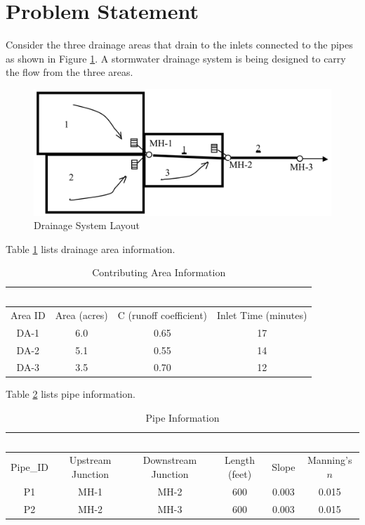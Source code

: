 \documentclass[12pt]{article}
\begin{document}
\section*{Problem Statement}
\label{prob:drainDesign} Consider the three drainage areas that drain to the inlets connected to the pipes as shown in Figure \ref{fig:DrainageLayout}.  
A stormwater drainage system is being designed to carry the flow from the three areas.  
\begin{figure}[ht!] %
\centering
   \includegraphics[width=6in]{DrainageLayout.jpg}
   \caption{Drainage System Layout}
   \label{fig:DrainageLayout} 
\end{figure}
Table \ref{tab:drainageArea} lists drainage area information.\\
\begin{table}[h!]
   \centering
   \caption{Contributing Area Information}
   \begin{tabular}{c c c c} %
   ~ & ~ & ~ & \\
   \hline
   \hline
      Area ID & Area (acres) & C (runoff coefficient) & Inlet Time (minutes) \\
      \hline
      DA-1 & 6.0 & 0.65 & 17 \\
      DA-2 & 5.1 & 0.55 & 14 \\
      DA-3 & 3.5 & 0.70 & 12 \\
      \hline
      \hline
   \end{tabular}
   \label{tab:drainageArea}
\end{table}

Table \ref{tab:pipes} lists pipe information.\\

\begin{table}[h!]
   \centering
   \caption{Pipe Information}
   \begin{tabular}{c c c c c c} %
   ~ & ~ & ~ & ~ & ~ & \\
   \hline
   \hline
      Pipe\_ID & Upstream Junction & Downstream Junction & Length (feet) & Slope & Manning's $n$ \\
      \hline
     P1 &  MH-1 & MH-2 & 600 & 0.003 & 0.015 \\
     P2 &  MH-2 & MH-3 & 600 & 0.003 & 0.015 \\
      \hline
      \hline
   \end{tabular}
   \label{tab:pipes}
\end{table}
\end{document}
